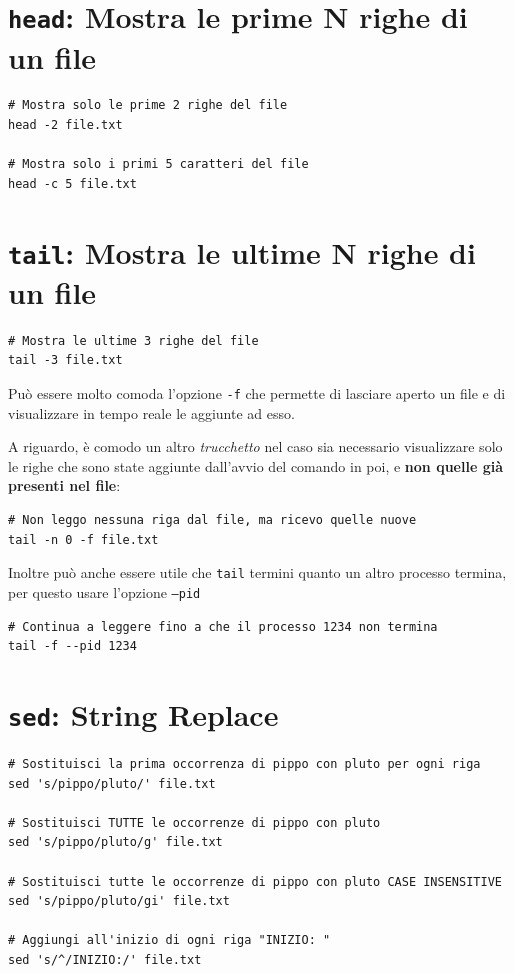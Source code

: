 \documentclass[a4paper]{report}
\newenvironment{info}{\begin{tcolorbox}[fonttitle=\sffamily\bfseries\large,title=Info,colframe=blue!75!white]}{\end{tcolorbox}}
\newenvironment{code}{\begin{tcolorbox}[size=small]}{\end{tcolorbox}}
\begin{document}
\section{\texttt{head}: Mostra le prime N righe di un file}
\begin{code}
	\begin{lstlisting}
# Mostra solo le prime 2 righe del file
head -2 file.txt

# Mostra solo i primi 5 caratteri del file
head -c 5 file.txt
	\end{lstlisting}
\end{code}

\section{\texttt{tail}: Mostra le ultime N righe di un file}
\begin{code}
	\begin{lstlisting}
# Mostra le ultime 3 righe del file
tail -3 file.txt
	\end{lstlisting}
\end{code}

\begin{info}
	Può essere molto comoda l'opzione \texttt{-f} che permette di lasciare aperto un file e di visualizzare in tempo reale le aggiunte ad esso.
	
	A riguardo, è comodo un altro \textit{trucchetto} nel caso sia necessario visualizzare solo le righe che sono state aggiunte dall'avvio del comando in poi, e \textbf{non quelle già presenti nel file}:
	\begin{lstlisting}
# Non leggo nessuna riga dal file, ma ricevo quelle nuove
tail -n 0 -f file.txt
	\end{lstlisting}
	
	Inoltre può anche essere utile che \texttt{tail} termini quanto un altro processo termina, per questo usare l'opzione \texttt{--pid}
	
	\begin{lstlisting}
# Continua a leggere fino a che il processo 1234 non termina
tail -f --pid 1234
	\end{lstlisting}
\end{info}

\section{\texttt{sed}: String Replace}
\begin{code}
\begin{lstlisting}
# Sostituisci la prima occorrenza di pippo con pluto per ogni riga
sed 's/pippo/pluto/' file.txt

# Sostituisci TUTTE le occorrenze di pippo con pluto
sed 's/pippo/pluto/g' file.txt

# Sostituisci tutte le occorrenze di pippo con pluto CASE INSENSITIVE
sed 's/pippo/pluto/gi' file.txt

# Aggiungi all'inizio di ogni riga "INIZIO: "
sed 's/^/INIZIO:/' file.txt
\end{lstlisting}
\end{code}
\end{document}
